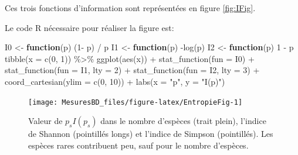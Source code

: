 \documentclass[
  11pt,
  american,
  a4paper,
  extrafontsizes,onecolumn,openright
  ]{memoir}
\newenvironment{Shaded}{\begin{snugshade}}{\end{snugshade}}
\newcommand{\AttributeTok}[1]{\textcolor[rgb]{0.77,0.63,0.00}{#1}}
\newcommand{\ControlFlowTok}[1]{\textcolor[rgb]{0.13,0.29,0.53}{\textbf{#1}}}
\newcommand{\DecValTok}[1]{\textcolor[rgb]{0.00,0.00,0.81}{#1}}
\newcommand{\FunctionTok}[1]{\textcolor[rgb]{0.00,0.00,0.00}{#1}}
\newcommand{\NormalTok}[1]{#1}
\newcommand{\OtherTok}[1]{\textcolor[rgb]{0.56,0.35,0.01}{#1}}
\newcommand{\SpecialCharTok}[1]{\textcolor[rgb]{0.00,0.00,0.00}{#1}}
\newcommand{\StringTok}[1]{\textcolor[rgb]{0.31,0.60,0.02}{#1}}
\begin{document}
\normalsize

Ces trois fonctions d'information sont représentées en figure \ref{fig:IFig}.

Le code R nécessaire pour réaliser la figure est:

\scriptsize

\begin{Shaded}
\begin{Highlighting}[]
\NormalTok{I0 }\OtherTok{\textless{}{-}} \ControlFlowTok{function}\NormalTok{(p) (}\DecValTok{1}\SpecialCharTok{{-}}\NormalTok{ p) }\SpecialCharTok{/}\NormalTok{ p}
\NormalTok{I1 }\OtherTok{\textless{}{-}} \ControlFlowTok{function}\NormalTok{(p) }\SpecialCharTok{{-}}\FunctionTok{log}\NormalTok{(p)}
\NormalTok{I2 }\OtherTok{\textless{}{-}} \ControlFlowTok{function}\NormalTok{(p) }\DecValTok{1} \SpecialCharTok{{-}}\NormalTok{ p}
\FunctionTok{tibble}\NormalTok{(}\AttributeTok{x =} \FunctionTok{c}\NormalTok{(}\DecValTok{0}\NormalTok{, }\DecValTok{1}\NormalTok{)) }\SpecialCharTok{\%\textgreater{}\%} 
  \FunctionTok{ggplot}\NormalTok{(}\FunctionTok{aes}\NormalTok{(x)) }\SpecialCharTok{+} 
    \FunctionTok{stat\_function}\NormalTok{(}\AttributeTok{fun =}\NormalTok{ I0) }\SpecialCharTok{+}
    \FunctionTok{stat\_function}\NormalTok{(}\AttributeTok{fun =}\NormalTok{ I1, }\AttributeTok{lty =} \DecValTok{2}\NormalTok{) }\SpecialCharTok{+}
    \FunctionTok{stat\_function}\NormalTok{(}\AttributeTok{fun =}\NormalTok{ I2, }\AttributeTok{lty =} \DecValTok{3}\NormalTok{) }\SpecialCharTok{+}
    \FunctionTok{coord\_cartesian}\NormalTok{(}\AttributeTok{ylim =} \FunctionTok{c}\NormalTok{(}\DecValTok{0}\NormalTok{, }\DecValTok{10}\NormalTok{)) }\SpecialCharTok{+}
    \FunctionTok{labs}\NormalTok{(}\AttributeTok{x =} \StringTok{"p"}\NormalTok{, }\AttributeTok{y =} \StringTok{"I(p)"}\NormalTok{)}
\end{Highlighting}
\end{Shaded}

\normalsize



\scriptsize

\begin{figure}

{\centering \texttt{[image: MesuresBD\_files/figure-latex/EntropieFig-1]} 

}

\caption{Valeur de \(p_{s}I(p_s)\) dans le nombre d'espèces (trait plein), l'indice de Shannon (pointillés longs) et l'indice de Simpson (pointillés). Les espèces rares contribuent peu, sauf pour le nombre d'espèces.}\label{fig:EntropieFig}
\end{figure}
\end{document}
